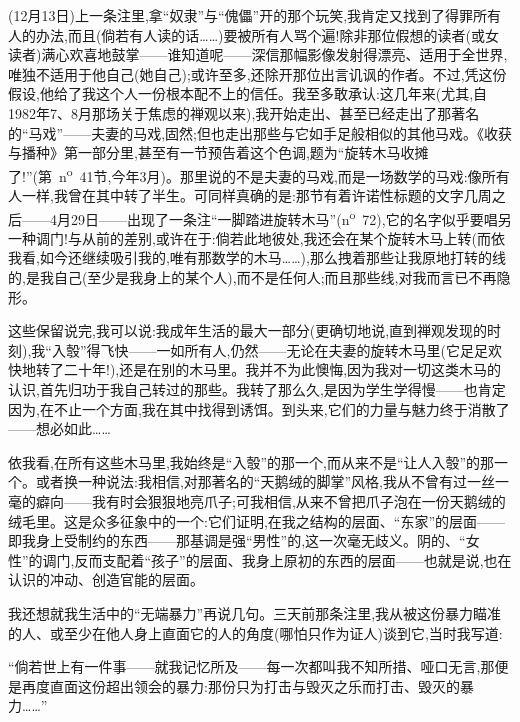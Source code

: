 (12月13日)上一条注里,拿“奴隶”与“傀儡”开的那个玩笑,我肯定又找到了得罪所有人的办法,而且(倘若有人读的话……)要被所有人骂个遍!除非那位假想的读者(或女读者)满心欢喜地鼓掌——谁知道呢——深信那幅影像发射得漂亮、适用于全世界,唯独不适用于他自己(她自己);或许至多,还除开那位出言讥讽的作者。不过,凭这份假设,他给了我这个人一份根本配不上的信任。我至多敢承认:这几年来(尤其,自1982年7、8月那场关于焦虑的禅观以来),我开始走出、甚至已经走出了那著名的“马戏”——夫妻的马戏,固然;但也走出那些与它如手足般相似的其他马戏。《收获与播种》第一部分里,甚至有一节预告着这个色调,题为“旋转木马收摊了!”(第~n\textsuperscript{o}~41节,今年3月)。那里说的不是夫妻的马戏,而是一场数学的马戏:像所有人一样,我曾在其中转了半生。可同样真确的是:那节有着许诺性标题的文字几周之后——4月29日——出现了一条注“一脚踏进旋转木马”(n\textsuperscript{o}~72),它的名字似乎要唱另一种调门\dmark{}!与从前的差别,或许在于:倘若此地彼处,我还会在某个旋转木马上转(而依我看,如今还继续吸引我的,唯有那数学的木马……),那么拽着那些让我原地打转的线的,是我自己(至少是我身上的某个人),而不是任何人;而且那些线,对我而言已不再隐形。

这些保留说完,我可以说:我成年生活的最大一部分(更确切地说,直到禅观发现的时刻),我“入彀”得飞快——一如所有人,仍然——无论在夫妻的旋转木马里(它足足欢快地转了二十年!),还是在别的木马里。我并不为此懊悔,因为我对一切这类木马的认识,首先归功于我自己转过的那些。我转了那么久,是因为学生学得慢——也肯定因为,在不止一个方面,我在其中找得到诱饵。到头来,它们的力量与魅力终于消散了——想必如此……

依我看,在所有这些木马里,我始终是“入彀”的那一个,而从来不是“让人入彀”的那一个。或者换一种说法:我相信,对那著名的“天鹅绒的脚掌”风格,我从不曾有过一丝一毫的癖向——我有时会狠狠地亮爪子;可我相信,从来不曾把爪子泡在一份天鹅绒的绒毛里。这是众多征象中的一个:它们证明,在我之结构的层面、“东家”的层面——即我身上受制约的东西——那基调是强“男性”的,这一次毫无歧义。阴的、“女性”的调门,反而支配着“孩子”的层面、我身上原初的东西的层面——也就是说,也在认识的冲动、创造官能的层面。

我还想就我生活中的“无端暴力”再说几句。三天前那条注里,我从被这份暴力瞄准的人、或至少在他人身上直面它的人的角度(哪怕只作为证人)谈到它,当时我写道:

“倘若世上有一件事——就我记忆所及——每一次都叫我不知所措、哑口无言,那便是再度直面这份超出领会的暴力:那份只为打击与毁灭之乐而打击、毁灭的暴力……”

